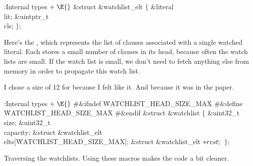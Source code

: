 \endnumberedlist

\Y\B\4:Internal types\X${}\mathrel+\E{}$\6
\&{struct} \&{watchlist\_elt} ${}\{{}$\1\6
\&{literal} \\{lit};\6
\&{uintptr\_t} \\{cls};\2\6
${}\}{}$;\par
\fi

Here's the , which represents the list of clauses
associated with a
single watched literal. Each  stores a small number of
clauses in its
head, because often the watch lists are small. If the watch list is small, we
don't need to fetch anything else from memory in order to propagate this watch
list.

I chose a size of 12 for  because I felt
like it. And
because it was in the paper.

\Y\B\4:Internal types\X${}\mathrel+\E{}$\6
\8\#\&{ifndef} \.{WATCHLIST\_HEAD\_SIZE\_MAX}\6
\8\#\&{define} \.{WATCHLIST\_HEAD\_SIZE\_MAX} \5\6
\8\#\&{endif}\6
\&{struct} \&{watchlist} ${}\{{}$\1\6
\&{uint32\_t} \\{size};\6
\&{uint32\_t} \\{capacity};\6
\&{struct} \&{watchlist\_elt} \\{elts}[\.{WATCHLIST\_HEAD\_SIZE\_MAX}];\6
\&{struct} \&{watchlist\_elt} ${}{*}\\{rest};{}$\2\6
${}\}{}$;\par
\fi

Traversing the watchlists. Using these macros makes the  code
a bit
cleaner.

